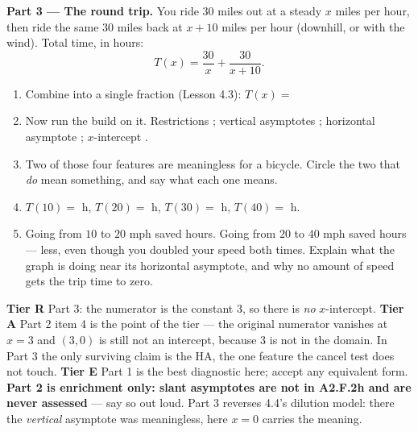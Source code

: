 \documentclass[10pt]{article}
\begin{document}
\begin{tcolorbox}[colback=white, colframe=black!40, title=\textbf{Tier E --- Extension},
    fonttitle=\bfseries, arc=1.5mm, left=3mm, right=3mm, top=2mm, bottom=2mm, breakable]
\vspace{4pt}
\textbf{Part 3 --- The round trip.} You ride $30$ miles out at a steady $x$ miles per hour, then ride
the same $30$ miles back at $x+10$ miles per hour (downhill, or with the wind). Total time, in hours:
\[ T(x)=\frac{30}{x}+\frac{30}{x+10}. \]
\begin{enumerate}[label=(\alph*), leftmargin=2.1em, itemsep=5pt]
  \item Combine into a single fraction (Lesson 4.3): \; $T(x)=$ 
  \item Now run the build on it. Restrictions ; vertical asymptotes ;
        horizontal asymptote ; $x$-intercept .
  \item Two of those four features are meaningless for a bicycle. Circle the two that \emph{do} mean
        something, and say what each one means.
  \item $T(10)=$  h, \; $T(20)=$  h, \; $T(30)=$  h, \;
        $T(40)=$  h.
  \item Going from $10$ to $20$ mph saved  hours. Going from $20$ to $40$ mph saved
         hours --- less, even though you doubled your speed both times. Explain what
        the graph is doing near its horizontal asymptote, and why no amount of speed gets the trip
        time to zero. 
\end{enumerate}
\end{tcolorbox}

\begin{teachernote}
\textbf{Tier R} Part 3: the numerator is the constant $3$, so there is \emph{no} $x$-intercept.
\textbf{Tier A} Part 2 item 4 is the point of the tier --- the original numerator vanishes at $x=3$ and
$(3,0)$ is still not an intercept, because $3$ is not in the domain. In Part 3 the only surviving claim
is the HA, the one feature the cancel test does not touch. \textbf{Tier E} Part 1 is the best
diagnostic here; accept any equivalent form. \textbf{Part 2 is enrichment only: slant asymptotes are
not in A2.F.2h and are never assessed} --- say so out loud. Part 3 reverses 4.4's dilution model: there
the \emph{vertical} asymptote was meaningless, here $x=0$ carries the meaning.
\end{teachernote}
\end{document}
